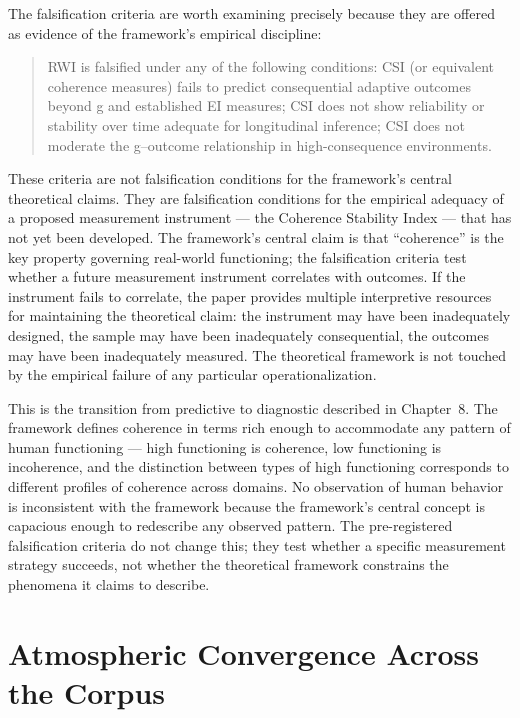 \documentclass[12pt, openright, twoside]{book}
\begin{document}
The falsification criteria are worth examining precisely because they are
offered as evidence of the framework's empirical discipline:

\begin{quote}
RWI is falsified under any of the following conditions: CSI (or equivalent
coherence measures) fails to predict consequential adaptive outcomes beyond
g and established EI measures; CSI does not show reliability or stability
over time adequate for longitudinal inference; CSI does not moderate the
g--outcome relationship in high-consequence environments.
\end{quote}

These criteria are not falsification conditions for the framework's central
theoretical claims. They are falsification conditions for the empirical
adequacy of a proposed measurement instrument --- the Coherence Stability
Index --- that has not yet been developed. The framework's central claim
is that ``coherence'' is the key property governing real-world functioning;
the falsification criteria test whether a future measurement instrument
correlates with outcomes. If the instrument fails to correlate, the paper
provides multiple interpretive resources for maintaining the theoretical
claim: the instrument may have been inadequately designed, the sample may
have been inadequately consequential, the outcomes may have been inadequately
measured. The theoretical framework is not touched by the empirical failure
of any particular operationalization.

This is the transition from predictive to diagnostic described in Chapter~8.
The framework defines coherence in terms rich enough to accommodate any pattern
of human functioning --- high functioning is coherence, low functioning is
incoherence, and the distinction between types of high functioning corresponds
to different profiles of coherence across domains. No observation of human
behavior is inconsistent with the framework because the framework's central
concept is capacious enough to redescribe any observed pattern. The pre-registered
falsification criteria do not change this; they test whether a specific
measurement strategy succeeds, not whether the theoretical framework constrains
the phenomena it claims to describe.

\section{Atmospheric Convergence Across the Corpus}
\end{document}
